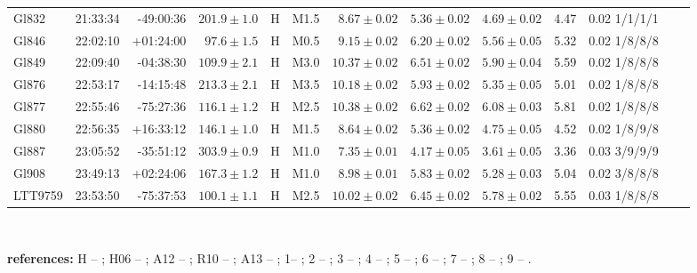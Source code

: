 \documentclass{aa}
\begin{document}
\begin{table}[h!]
{\begin{tabular}{ l r r r c c r r r r r r r}
Gl832 & 21:33:34 & -49:00:36 & $201.9 \pm  1.0$ & H & M1.5 &  $8.67 \pm 0.02$ & $5.36 \pm 0.02$ & $4.69 \pm 0.02$ & 4.47 & 0.02 1/1/1/1 \\
Gl846 & 22:02:10 & +01:24:00 & $97.6 \pm  1.5$ & H & M0.5 &  $9.15 \pm 0.02$ & $6.20 \pm 0.02$ & $5.56 \pm 0.05$ & 5.32 & 0.02 1/8/8/8 \\
Gl849 & 22:09:40 & -04:38:30 & $109.9 \pm  2.1$ & H & M3.0 &  $10.37 \pm 0.02$ & $6.51 \pm 0.02$ & $5.90 \pm 0.04$ & 5.59 & 0.02 1/8/8/8 \\
Gl876 & 22:53:17 & -14:15:48 & $213.3 \pm  2.1$ & H & M3.5 &  $10.18 \pm 0.02$ & $5.93 \pm 0.02$ & $5.35 \pm 0.05$ & 5.01 & 0.02 1/8/8/8 \\
Gl877 & 22:55:46 & -75:27:36 & $116.1 \pm  1.2$ & H & M2.5 &  $10.38 \pm 0.02$ & $6.62 \pm 0.02$ & $6.08 \pm 0.03$ & 5.81 & 0.02 1/8/8/8 \\
Gl880 & 22:56:35 & +16:33:12 & $146.1 \pm  1.0$ & H & M1.5 &  $8.64 \pm 0.02$ & $5.36 \pm 0.02$ & $4.75 \pm 0.05$ & 4.52 & 0.02 1/8/9/8 \\
Gl887 & 23:05:52 & -35:51:12 & $303.9 \pm  0.9$ & H & M1.0 &  $7.35 \pm 0.01$ & $4.17 \pm 0.05$ & $3.61 \pm 0.05$ & 3.36 & 0.03 3/9/9/9 \\
Gl908 & 23:49:13 & +02:24:06 & $167.3 \pm  1.2$ & H & M1.0 &  $8.98 \pm 0.01$ & $5.83 \pm 0.02$ & $5.28 \pm 0.03$ & 5.04 & 0.02 3/8/8/8 \\
LTT9759 & 23:53:50 & -75:37:53 & $100.1 \pm  1.1$ & H & M2.5 &  $10.02 \pm 0.02$ & $6.45 \pm 0.02$ & $5.78 \pm 0.02$ & 5.55 & 0.03 1/8/8/8 \\
\hline
\hline
\end{tabular}
}
{
\\
\raggedright{
\textbf{references:} H -- \citep{van-Leeuwen-2007}; H06 -- \citet{Henry-2006}; A12 -- \citet{Anglada-Escude-2012}; R10 -- \citet{Riedel-2010}; A13 -- \citet{Anglada-Escude-2013}; 1-- \citet{Koen-2010}; 2 -- \citet{Henden-2009,Henden-2012}; 3 -- \citet{Perryman-1997}; 4 -- \citet{Weis-1993}; 5 -- \citet{Laing-1989}; 6 -- \citet{Fabricius-2002}; 7 -- \citet{Dawson-1992}; 8 -- \citet{Skrutskie-2006}; 9 -- \citet{Leggett-1992}. \\
}
}
\end{table}








\end{document}
